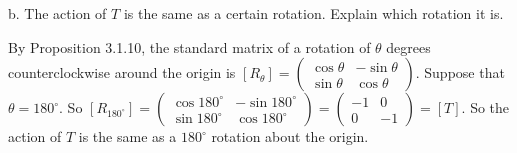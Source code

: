 \documentclass[12pt]{article}
\newenvironment{problem}[2][Problem]
{
	\begin{trivlist} 
		\item[\hskip \labelsep {\bfseries #1 #2:}]
	}
{
	\end{trivlist}
	}
\newenvironment{solution}[1][Solution]
{
	\begin{trivlist} 
		\item[\hskip \labelsep {\itshape #1:}]
	}
	{
	\end{trivlist}
}
\begin{document}
\begin{problem}{5}
\noindent
\newline
\newline
b. The action of $T$ is the same as a certain rotation. Explain which rotation it is.
\begin{solution}
By Proposition 3.1.10, the standard matrix of a rotation of $\theta$ degrees counterclockwise around the origin is $[R_{\theta}]=\begin{pmatrix} \cos \theta & - \sin \theta \\ \sin \theta & \cos \theta \end{pmatrix}$. Suppose that $\theta = 180^{\circ}$. So $[R_{180^{\circ}}]=\begin{pmatrix} \cos 180^{\circ} & - \sin 180^{\circ} \\ \sin 180^{\circ} & \cos 180^{\circ} \end{pmatrix} = \begin{pmatrix} -1 & 0 \\ 0 & -1\end{pmatrix} = [T]$. So the action of $T$ is the same as a $180^{\circ}$ rotation about the origin. 
\end{solution}

\end{problem}
\end{document}
